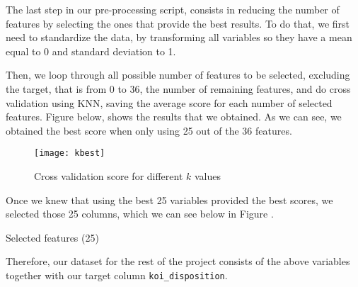 The last step in our pre-processing script, consists in reducing the number of features
by selecting the ones that provide the best results. To do that, we first need to
standardize the data, by transforming all variables so they have a mean equal to 0
and standard deviation to 1.

Then, we loop through all possible number of features to be selected, 
excluding the target, that is from 0
to 36, the number of remaining features, and do cross validation using KNN, saving
the average score for each number of selected features. Figure \cite{fig:feature_cross}
below, shows the results that we obtained. As we can see, we obtained the best score
when only using 25 out of the 36 features.

\begin{figure}[H]
    \centering
    \texttt{[image: kbest]}
    \caption{Cross validation score for different $k$ values}%
    \label{fig:feature_cross}
\end{figure}

Once we knew that using the best 25 variables provided the best scores, we selected
those 25 columns, which we can see below in Figure \cite{tab:features}.

\begin{table}[H]
    \centering
    \caption{Selected features (25)}%
    \label{tab:features}
    
\end{table}

Therefore, our dataset for the rest of the project consists of the above variables
together with our target column \texttt{koi\_disposition}.